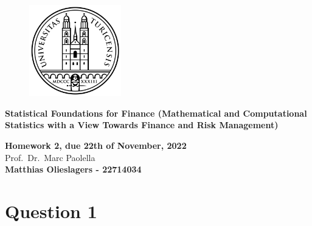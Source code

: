 \documentclass[12pt]{article}
\begin{document}
\pagestyle{empty}

\bigskip

\begin{figure}[htp]
    \centering
    \includegraphics[width=4cm]{uzh logo 2.png}
    \label{fig:UZH}
\end{figure}

\begin{Large}
	\begin{center}
		\textbf{Statistical Foundations for Finance (Mathematical and Computational Statistics with a View Towards Finance and Risk Management)}
	\end{center}
\end{Large}

\vspace{2cm}

\begin{large}	
	\begin{center}
		\textbf{Homework 2, due 22th of November, 2022} \vspace{0.1cm} \\ {Prof.\ Dr.\ Marc Paolella } \vspace{2cm} \\ \textbf{Matthias Olieslagers - 22714034} \vspace{2cm}
	\end{center}
\end{large}

\tableofcontents

\newpage

\bigskip
\section{Question 1}
\end{document}
